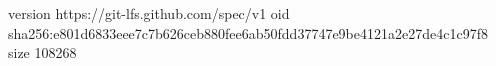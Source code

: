 version https://git-lfs.github.com/spec/v1
oid sha256:e801d6833eee7c7b626ceb880fee6ab50fdd37747e9be4121a2e27de4c1c97f8
size 108268
